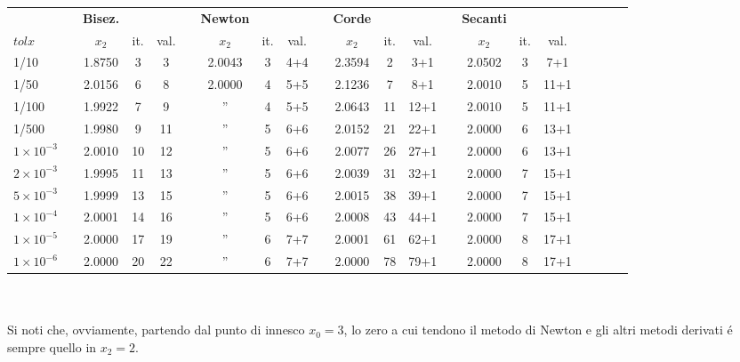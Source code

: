 \footnotesize\noindent\begin{tabular}{l*{20}{c}}
& \vline& \tiny\textbf{Bisez.} &     &      & \vline& \tiny\textbf{Newton} &     &      &\vline& \tiny\textbf{Corde} &    &      &\vline& \tiny\textbf{Secanti} \\
 \(tolx\) & \vline& \(x_2\)   & it. & val. & \vline& \(x_2\)   & it. & val.  &\vline& \(x_2\)  & it.& val. &\vline& \(x_2\) & it.&val.\\
\hline
 1/10                 &\vline& 1.8750 & 3  & 3  &\vline& 2.0043 & 3 & 4+4 &\vline& 2.3594 & 2 & 3+1  &\vline& 2.0502 & 3 & 7+1  \\
 1/50                 &\vline& 2.0156 & 6  & 8  &\vline& 2.0000 & 4 & 5+5 &\vline& 2.1236 & 7 & 8+1  &\vline& 2.0010 & 5 & 11+1 \\
 1/100                &\vline& 1.9922 & 7  & 9  &\vline& ''     & 4 & 5+5 &\vline& 2.0643 & 11& 12+1 &\vline& 2.0010 & 5 & 11+1 \\
 1/500                &\vline& 1.9980 & 9  & 11 &\vline& ''     & 5 & 6+6 &\vline& 2.0152 & 21& 22+1 &\vline& 2.0000 & 6 & 13+1 \\
 \(1 \times 10^{-3}\) &\vline& 2.0010 & 10 & 12 &\vline& ''     & 5 & 6+6 &\vline& 2.0077 & 26& 27+1 &\vline& 2.0000 & 6 & 13+1 \\
 \(2 \times 10^{-3}\) &\vline& 1.9995 & 11 & 13 &\vline& ''     & 5 & 6+6 &\vline& 2.0039 & 31& 32+1 &\vline& 2.0000 & 7 & 15+1 \\
 \(5 \times 10^{-3}\) &\vline& 1.9999 & 13 & 15 &\vline& ''     & 5 & 6+6 &\vline& 2.0015 & 38& 39+1 &\vline& 2.0000 & 7 & 15+1 \\
 \(1 \times 10^{-4}\) &\vline& 2.0001 & 14 & 16 &\vline& ''     & 5 & 6+6 &\vline& 2.0008 & 43& 44+1 &\vline& 2.0000 & 7 & 15+1 \\
 \(1 \times 10^{-5}\) &\vline& 2.0000 & 17 & 19 &\vline& ''     & 6 & 7+7 &\vline& 2.0001 & 61& 62+1 &\vline& 2.0000 & 8 & 17+1  \\
 \(1 \times 10^{-6}\) &\vline& 2.0000 & 20 & 22 &\vline& ''     & 6 & 7+7 &\vline& 2.0000 & 78& 79+1 &\vline& 2.0000 & 8 & 17+1  \\
\end{tabular}\\
\\

\normalsize\noindent Si noti che, ovviamente, partendo dal punto di innesco \(x_0 = 3\), lo zero a cui tendono il metodo di Newton e gli altri metodi derivati \'e sempre quello in \(x_2 = 2\).
\\


